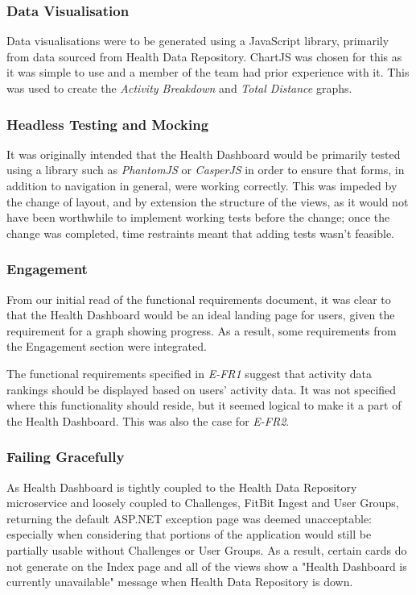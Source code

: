 \subsubsection{Data Visualisation}
\par
Data visualisations were to be generated using a JavaScript library, primarily from data sourced from Health Data Repository. ChartJS\cite{chartjs} was chosen for this as it was simple to use and a member of the team had prior experience with it. This was used to create the \textit{Activity Breakdown} and \textit{Total Distance} graphs.

\subsubsection{Headless Testing and Mocking}
\par
It was originally intended that the Health Dashboard would be primarily tested using a library such as \textit{PhantomJS} or \textit{CasperJS} in order to ensure that forms, in addition to navigation in general, were working correctly. This was impeded by the change of layout, and by extension the structure of the views, as it would not have been worthwhile to implement working tests before the change; once the change was completed, time restraints meant that adding tests wasn't feasible.

\subsubsection{Engagement}
\par
From our initial read of the functional requirements document, it was clear to that the Health Dashboard would be an ideal landing page for users, given the requirement for a graph showing progress. As a result, some requirements from the Engagement section were integrated.

\par
The functional requirements specified in \textit{E-FR1} suggest that activity data rankings should be displayed based on users' activity data. It was not specified where this functionality should reside, but it seemed logical to make it a part of the Health Dashboard. This was also the case for \textit{E-FR2}.

\subsubsection{Failing Gracefully}
\par
As Health Dashboard is tightly coupled to the Health Data Repository microservice and loosely coupled to Challenges, FitBit Ingest and User Groups, returning the default ASP.NET exception page was deemed unacceptable: especially when considering that portions of the application would still be partially usable without Challenges or User Groups. As a result, certain cards do not generate on the Index page and all of the views show a "Health Dashboard is currently unavailable" message when Health Data Repository is down.